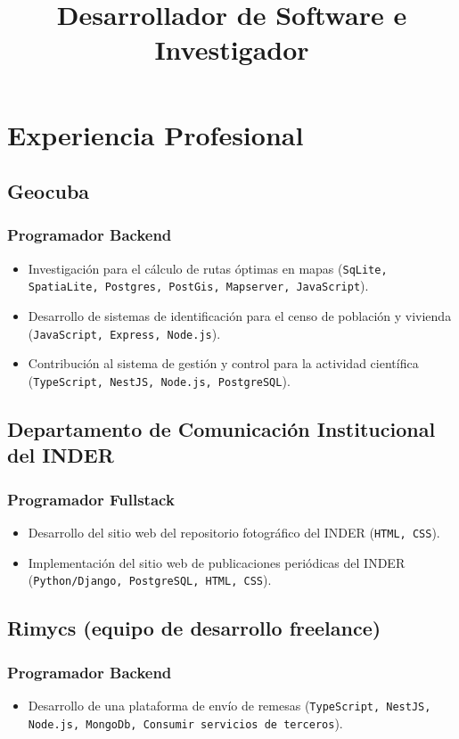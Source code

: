 \documentclass[11pt,a4paper,sans]{moderncv} \usepackage[utf8]{inputenc} \usepackage[T1]{fontenc} \usepackage{enumitem} \usepackage[top=0.6in, bottom=0.6in, left=0.75in, right=0.75in]{geometry} \usepackage{multido} \usepackage{hyperref} \usepackage{xcolor} \usepackage{csquotes}
\title{Desarrollador de Software e Investigador}
\begin{document}
 \makecvtitle
	
	\section{Experiencia Profesional} \subsection{Geocuba} \subsubsection{Programador Backend} \begin{itemize} \item Investigación para el cálculo de rutas óptimas en mapas (\texttt{SqLite, SpatiaLite, Postgres, PostGis, Mapserver, JavaScript}). \item Desarrollo de sistemas de identificación para el censo de población y vivienda (\texttt{JavaScript, Express, Node.js}). \item Contribución al sistema de gestión y control para la actividad científica (\texttt{TypeScript, NestJS, Node.js, PostgreSQL}). \end{itemize}
	
	\subsection{Departamento de Comunicación Institucional del INDER} \subsubsection{Programador Fullstack} \begin{itemize} \item Desarrollo del sitio web del repositorio fotográfico del INDER (\texttt{HTML, CSS}). \item Implementación del sitio web de publicaciones periódicas del INDER (\texttt{Python/Django, PostgreSQL, HTML, CSS}). \end{itemize}
	
	\subsection{Rimycs (equipo de desarrollo freelance)} \subsubsection{Programador Backend} \begin{itemize} \item Desarrollo de una plataforma de envío de remesas (\texttt{TypeScript, NestJS, Node.js, MongoDb, Consumir servicios de terceros}). \end{itemize}
	
\end{document}
